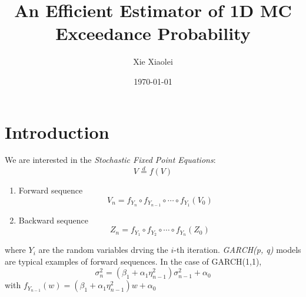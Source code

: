 \documentclass{beamer}
\title{An Efficient Estimator of 1D MC Exceedance Probability} %
\author{Xie Xiaolei} %
\institute[UCPH] %
{
Copenhagen University  \\ %
\medskip
\textit{hnq365@math.ku.dk} %
}
\date{\today} %
\begin{document}
\begin{frame}
\titlepage %
\end{frame}


\section{Introduction}
\begin{frame}
  We are interested in the {\it Stochastic Fixed Point Equations}:
  \[
  V \overset{d}{=} f(V)
  \]
  \begin{enumerate}
  \item Forward sequence
    \[
    V_n = f_{Y_n} \circ f_{Y_{n-1}} \circ \cdots \circ f_{Y_1} (V_0)
    \]
    \item Backward sequence
      \[
      Z_n  = f_{Y_1} \circ f_{Y_{2}} \circ \cdots \circ f_{Y_n} (Z_0)
      \]
    \end{enumerate}
    where $Y_i$ are the random variables drving the $i$-th iteration.
    {\it GARCH(p, q)} models are typical examples of forward
    sequences. In the case of GARCH(1,1),
    \[
    \sigma_n^2 = (\beta_1 + \alpha_1 \eta_{n-1}^2)\sigma_{n-1}^2 + \alpha_0
    \]
    with $f_{Y_{n-1}}(w) = (\beta_1 + \alpha_1 \eta_{n-1}^2) w + \alpha_0$ 
\end{frame}

\begin{frame}

  
\end{frame}
\end{document}
